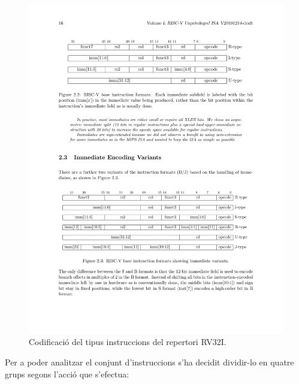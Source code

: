 \documentclass[10pt,a4paper,twocolumn,twoside]{article}
\begin{document}
    \begin{figure}[!h]
    \centering
    	\includegraphics[width=\linewidth]{pdf/Encoding.pdf}
        \caption{Codificació del tipus instruccions del repertori RV32I.}
        \label{fig:baseinstformatsimm}
    \end{figure}
    
    Per a poder analitzar el conjunt d'instruccions s'ha decidit dividir-lo en quatre grups segons l'acció que s'efectua:
    
\end{document}
